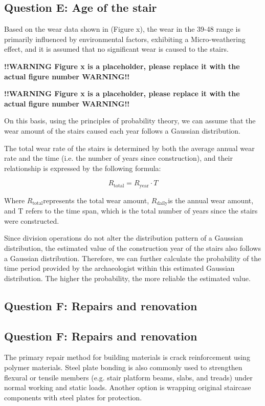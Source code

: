 \documentclass{mcmthesis}
\begin{document}
\subsection{Question E: Age of the stair }

Based on the wear data shown in (Figure x), the wear in the 39-48 range is primarily influenced by environmental factors, exhibiting a Micro-weathering effect, and it is assumed that no significant wear is caused to the stairs.

\textbf{!!WARNING Figure x is a placeholder, please replace it with the actual figure number WARNING!!}

\textbf{!!WARNING Figure x is a placeholder, please replace it with the actual figure number WARNING!!}

On this basis, using the principles of probability theory, we can assume that the wear amount of the stairs caused each year follows a Gaussian distribution.

The total wear rate of the stairs is determined by both the average annual wear rate and the time (i.e. the number of years since construction), and their relationship is expressed by the following formula:

\[R_{\text{total}} = R_{\text{year}} \cdot T \]

Where $R_{\text{total}}$​ represents the total wear amount, $R_{\text{daily}}$​ is the annual wear amount, and T refers to the time span, which is the total number of years since the stairs were constructed.

Since division operations do not alter the distribution pattern of a Gaussian distribution, the estimated value of the construction year of the stairs also follows a Gaussian distribution. Therefore, we can further calculate the probability of the time period provided by the archaeologist within this estimated Gaussian distribution. The higher the probability, the more reliable the estimated value.

\subsection{Question F: Repairs and renovation}
\subsection{Question F: Repairs and renovation}

The primary repair method for building materials is crack reinforcement using polymer materials\cite{YTLX200401034}. Steel plate bonding is also commonly used to strengthen flexural or tensile members (e.g. stair platform beams, slabs, and treads) under normal working and static loads. Another option is wrapping original staircase components with steel plates for protection.
\end{document}
